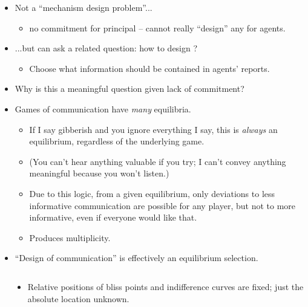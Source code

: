 \documentclass[english,handout,10pt]{beamer}		%
\def\lyxframeend{} %
\begin{document}
\begin{itemize}
	\item Not a ``mechanism design problem''...
	\begin{itemize}
		\item \alert{no commitment} for principal -- cannot really ``design'' any  for agents.
	\end{itemize}
	\item ...but can ask a related question: how to design ?
	\begin{itemize}
		\item Choose what information should be contained in agents' reports.
		
	\end{itemize}
\end{itemize}
\lyxframeend


\begin{itemize}
	\item Why is this a meaningful question given lack of commitment?
	\item Games of communication have \emph{many} equilibria.
	\begin{itemize}
		\item If I say gibberish and you ignore everything I say, this is \emph{always} an equilibrium, regardless of the underlying game.
		\item (You can't hear anything valuable if you try; I can't convey anything meaningful because you won't listen.)
		\item Due to this logic, from a given equilibrium, only deviations to less informative communication are possible for any player, but not to more informative, even if everyone would like that.
		\item Produces multiplicity.
	\end{itemize}
	\item ``Design of communication'' is effectively an equilibrium selection.
\end{itemize}
\lyxframeend


\begin{columns}
	\begin{column}{0.55\textwidth}
		\begin{center}
			
		\end{center}
	\end{column}
	\begin{column}{0.4\textwidth}
		{\small
			\begin{itemize}
				\item Relative positions of bliss points and indifference curves are fixed; just the absolute location unknown.
			\end{itemize}
		}
	\end{column}
\end{columns}
\lyxframeend
\end{document}
